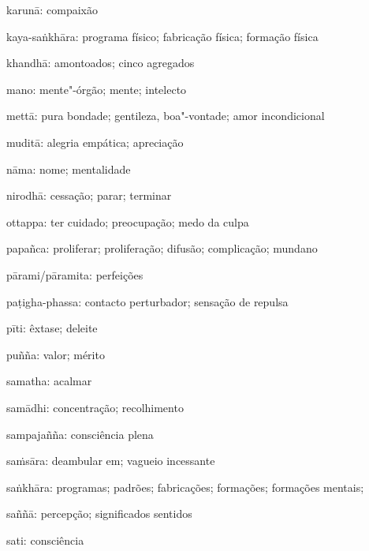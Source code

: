\begin{glossarydescription}
\item[karunā:] compaixão

\item[kaya-saṅkhāra:] programa físico; fabricação física; formação física

\item[khandhā:] amontoados; cinco agregados

\item[mano:] mente"-órgão; mente; intelecto

\item[mettā:] pura bondade; gentileza, boa"-vontade; amor incondicional

\item[muditā:] alegria empática; apreciação

\item[nāma:] nome; mentalidade

\item[nirodhā:] cessação; parar; terminar

\item[ottappa:] ter cuidado; preocupação; medo da culpa

\item[papañca:] proliferar; proliferação; difusão; complicação; mundano

\item[pārami/pāramita:] perfeições

\item[paṭigha-phassa:] contacto perturbador; sensação de repulsa

\item[pīti:] êxtase; deleite

\item[puñña:] valor; mérito

\item[samatha:] acalmar

\item[samādhi:] concentração; recolhimento

\item[sampajañña:] consciência plena

\item[saṁsāra:] deambular em; vagueio incessante

\item[saṅkhāra:] programas; padrões; fabricações; formações; formações mentais;

\item[saññā:] percepção; significados sentidos

\item[sati:] consciência


\end{glossarydescription}
